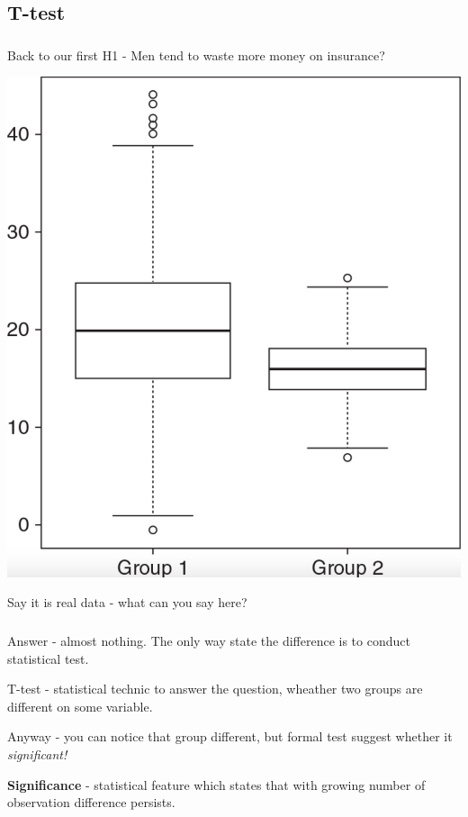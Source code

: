 \documentclass[t, 11pt]{beamer}
\begin{document}
\subsection{T-test}
\begin{frame}
	\frametitle{\insertsection} 
	\framesubtitle{\insertsubsection} 
	
	Back to our first H1 - Men tend to waste more money on insurance?
	
	\begin{center}
		\includegraphics[scale=0.17]{boxp3}
	\end{center}

 Say it is real data - what can you say here?
	 
\end{frame}	
    
    \begin{frame}
    	\frametitle{\insertsection} 
    	\framesubtitle{\insertsubsection} 
    	Answer - almost nothing. The only way state the difference is to conduct statistical test. 
    	
    	\vspace{1cm}
    	
    	T-test - statistical technic to answer the question, wheather two groups are different on some variable. 
    	
    	\vspace{0.5cm}
    	
    	Anyway - you can notice that group different, but formal test suggest whether it \emph{significant!}
    	
    	\vspace{0.5cm}
    	
    	\textbf{Significance} - statistical feature which states that with growing number of observation difference persists. 
    	
    \end{frame}	
\end{document}
